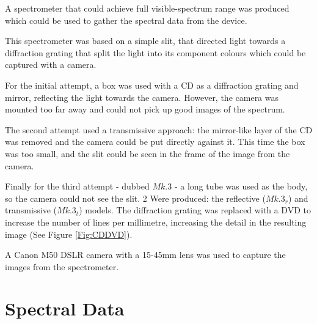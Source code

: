 A spectrometer that could achieve full visible-spectrum range was produced which could be used to gather the spectral data from the device.

This spectrometer was based on a simple slit, that directed light towards a diffraction grating that split the light into its component colours which could be captured with a camera.

For the initial attempt, a box was used with a CD as a diffraction grating and mirror, reflecting the light towards the camera. However, the camera was mounted too far away and could not pick up good images of the spectrum.

The second attempt used a transmissive approach: the mirror-like layer of the CD was removed and the camera could be put directly against it. This time the box was too small, and the slit could be seen in the frame of the image from the camera.

Finally for the third attempt - dubbed $Mk.3$ - a long tube was used as the body, so the camera could not see the slit. 2 Were produced: the reflective ($Mk.3_r$) and transmissive ($Mk.3_t$) models. The diffraction grating was replaced with a DVD to increase the number of lines per millimetre, increasing the detail in the resulting image (See Figure \ref{Fig:CDDVD}).

A Canon M50 DSLR camera with a 15-45mm lens was used to capture the images from the spectrometer. 

\section{Spectral Data}


